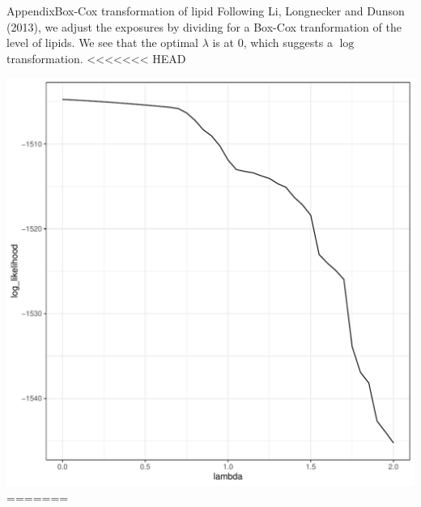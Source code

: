 \documentclass{beamer}\usepackage[]{graphicx}\usepackage[]{color}
\makeatletter
\def\maxwidth{ %
  \ifdim\Gin@nat@width>\linewidth
    \linewidth
  \else
    \Gin@nat@width
  \fi
}
\newenvironment{kframe}{%
 \def\at@end@of@kframe{}%
 \ifinner\ifhmode%
  \def\at@end@of@kframe{\end{minipage}}%
  \begin{minipage}{\columnwidth}%
 \fi\fi%
 \def\FrameCommand##1{\hskip\@totalleftmargin \hskip-\fboxsep
 \colorbox{shadecolor}{##1}\hskip-\fboxsep
     \hskip-\linewidth \hskip-\@totalleftmargin \hskip\columnwidth}%
 \MakeFramed {\advance\hsize-\width
   \@totalleftmargin\z@ \linewidth\hsize
   \@setminipage}}%
 {\par\unskip\endMakeFramed%
 \at@end@of@kframe}
\newenvironment{knitrout}{}{} %
\makeatother
\begin{document}
\begin{frame}{Appendix}{Box-Cox transformation of lipid}
Following Li, Longnecker and Dunson (2013), we adjust the exposures by dividing for a Box-Cox tranformation of the level of lipids. We see that the optimal $\lambda$ is at 0, which suggests a $\log$ transformation. 
\begin{knitrout}
<<<<<<< HEAD
\color{fgcolor}\begin{kframe}


{\ttfamily\noindent\bfseries{}}

{\ttfamily\noindent\bfseries{}}\end{kframe}
\includegraphics[width=\maxwidth]{figure/unnamed-chunk-5-1} 
=======
\color{fgcolor}

\end{knitrout}
\end{frame}
\end{document}
